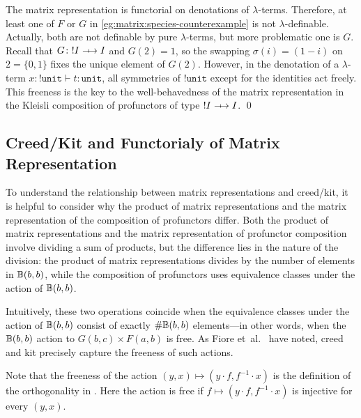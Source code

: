 \begin{remark}
    The matrix representation is functorial on denotations of \( \lambda \)-terms.
    Therefore, at least one of \( F \) or \( G \) in \cref{eg:matrix:species-counterexample} is not \( \lambda \)-definable.
    Actually, both are not definable by pure \( \lambda \)-terms, but more problematic one is \( G \).
    Recall that \( G \colon {!}I \profarrow I \) and \( G(2) = 1 \), so the swapping \( \sigma(i) = (1-i) \) on \( 2 = \{ 0,1 \} \) fixes the unique element of \( G(2) \).
    However, in the denotation of a \( \lambda \)-term \( x \colon {!}\mathtt{unit} \vdash t \colon \mathtt{unit} \), all symmetries of \( {!}\mathtt{unit} \) except for the identities act freely.
    This freeness is the key to the well-behavedness of the matrix representation in the Kleisli composition of profunctors of type \( {!}I \profarrow I \).
    \qed
\end{remark}


\subsection{Creed/Kit and Functorialy of Matrix Representation}
To understand the relationship between matrix representations and creed/kit, it is helpful to consider why the product of matrix representations and the matrix representation of the composition of profunctors differ. Both the product of matrix representations and the matrix representation of profunctor composition involve dividing a sum of products, but the difference lies in the nature of the division: the product of matrix representations divides by the number of elements in 
\( \mathbb{B}(b,b) \), while the composition of profunctors uses equivalence classes under the action of \( \mathbb{B}(b,b) \).

Intuitively, these two operations coincide when the equivalence classes under the action of \( \mathbb{B}(b,b) \) consist of exactly \( \#\mathbb{B}(b,b) \) elements---in other words, when the \( \mathbb{B}(b,b) \) action to \( G(b,c) \times F(a,b) \) is free.
As Fiore et~al.~\cite{Fiore2024} have noted, creed and kit precisely capture the freeness of such actions.

Note that the freeness of the action \( (y,x) \mapsto (y \cdot f, f^{-1} \cdot x) \) is the definition of the orthogonality in \cite[Definition~7.8]{Fiore2024}.
Here the action is free if \( f \mapsto (y \cdot f, f^{-1} \cdot x) \) is injective for every \( (y,x) \).

